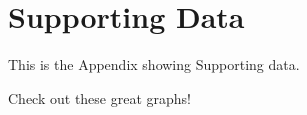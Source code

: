 

\chapter{Supporting Data}
\label{ap1:data}
This is the Appendix showing Supporting data.

Check out these great graphs!


